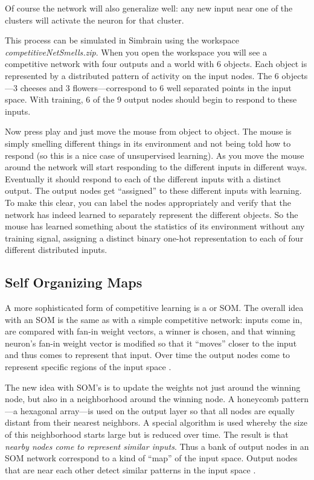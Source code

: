 Of course the network will also generalize well: any new input near one of the clusters will activate the neuron for that cluster. 

This process can be simulated in Simbrain using the workspace \emph{competitiveNetSmells.zip}. When you open the workspace you will see a competitive network with four outputs and a world with 6 objects. Each object is represented by a distributed pattern of activity on the input nodes. The 6 objects---3 cheeses and 3 flowers---correspond to 6 well separated points in the input space. With training, 6 of the 9 output nodes should begin to respond to these inputs.

Now press play and just move the mouse from object to object. The mouse is simply smelling different things in its environment and not being told how to respond (so this is a nice case of unsupervised learning). As you move the mouse around the network will start responding to the different inputs in different ways. Eventually it should respond to each of the different inputs with a distinct output. The output nodes get ``assigned'' to these different inputs with learning. To make this clear, you can label the nodes appropriately and verify that the network has indeed learned to separately represent the different objects. So the mouse has learned something about the statistics of its environment without any training signal, assigning a distinct binary one-hot representation to each of four different distributed inputs.

\subsection{Self Organizing Maps}

A more sophisticated form of competitive learning is a  or SOM. The overall idea with an SOM is the same as with a simple competitive network: inputs come in, are compared with fan-in weight vectors, a winner is chosen, and that winning neuron's fan-in weight vector is modified so that it ``moves'' closer to the input and thus comes to represent that input. Over time the output nodes come to represent specific regions of the input space \cite{kohonen1990self}.

The new idea with SOM's is to update the weights not just around the winning node, but also in a neighborhood around the winning node. A honeycomb pattern---a hexagonal array---is used on the output layer so that all nodes are equally distant from their nearest neighbors. A special algorithm is used whereby the size of this neighborhood starts large but is reduced over time. The result is that \emph{nearby nodes come to represent similar inputs}. Thus a  bank of output nodes in an SOM network correspond to a kind of ``map'' of the input space. Output nodes that are near each other detect similar patterns in the input space \cite{kohonen1990self}. 


